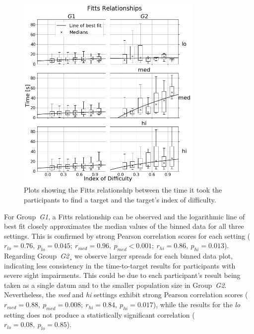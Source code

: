 \documentclass[acmsmall]{acmart}
\begin{document}
\begin{figure}
  \centering
  \includegraphics[width=0.8\textwidth]{figures/fitts_fit.png}
  \caption{Plots showing the Fitts relationship between the time it took the participants to find a target and the target's index of difficulty. }\label{fig:fitts-results}
\end{figure}

For Group~\textit{G1}, a Fitts relationship can be observed and the logarithmic line of best fit closely approximates the median values of the binned data for all three settings. 
This is confirmed by strong Pearson correlation scores for each setting ($r_{lo} = 0.76,~p_{lo} = 0.045;~r_{med} = 0.96,~p_{med}<0.001;~r_{hi} = 0.86,~p_{hi} = 0.013$).
Regarding Group~\textit{G2}¸ we observe larger spreads for each binned data plot, indicating less consistency in the time-to-target results for participants with severe sight impairments.
This could be due to each participant's result being taken as a single datum and to the smaller population size in Group~\textit{G2}.
Nevertheless, the \textit{med} and \textit{hi} settings exhibit strong Pearson correlation scores ($r_{med} = 0.88,~p_{med} = 0.008;~r_{hi} = 0.84,~p_{hi} = 0.017$), while the results for the \textit{lo} setting does not produce a statistically significant correlation ($r_{lo} = 0.08,~p_{lo} = 0.85$).
\end{document}
